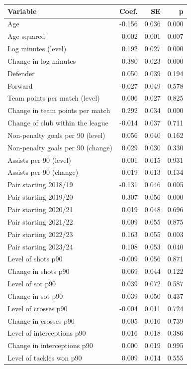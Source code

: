 \begin{tabular}{lrrr}
\toprule
Variable & Coef. & SE & p \\
\midrule
Age & -0.156 & 0.036 & 0.000 \\
Age squared & 0.002 & 0.001 & 0.007 \\
Log minutes (level) & 0.192 & 0.027 & 0.000 \\
Change in log minutes & 0.380 & 0.023 & 0.000 \\
Defender & 0.050 & 0.039 & 0.194 \\
Forward & -0.027 & 0.049 & 0.578 \\
Team points per match (level) & 0.006 & 0.027 & 0.825 \\
Change in team points per match & 0.292 & 0.034 & 0.000 \\
Change of club within the league & -0.014 & 0.037 & 0.711 \\
Non-penalty goals per 90 (level) & 0.056 & 0.040 & 0.162 \\
Non-penalty goals per 90 (change) & 0.029 & 0.030 & 0.330 \\
Assists per 90 (level) & 0.001 & 0.015 & 0.931 \\
Assists per 90 (change) & 0.019 & 0.013 & 0.134 \\
Pair starting 2018/19 & -0.131 & 0.046 & 0.005 \\
Pair starting 2019/20 & 0.307 & 0.056 & 0.000 \\
Pair starting 2020/21 & 0.019 & 0.048 & 0.696 \\
Pair starting 2021/22 & 0.009 & 0.055 & 0.875 \\
Pair starting 2022/23 & 0.163 & 0.055 & 0.003 \\
Pair starting 2023/24 & 0.108 & 0.053 & 0.040 \\
Level of shots p90 & -0.009 & 0.056 & 0.871 \\
Change in shots p90 & 0.069 & 0.044 & 0.122 \\
Level of sot p90 & 0.039 & 0.072 & 0.587 \\
Change in sot p90 & -0.039 & 0.050 & 0.437 \\
Level of crosses p90 & -0.004 & 0.011 & 0.724 \\
Change in crosses p90 & 0.005 & 0.016 & 0.739 \\
Level of interceptions p90 & 0.016 & 0.018 & 0.386 \\
Change in interceptions p90 & 0.000 & 0.019 & 0.995 \\
Level of tackles won p90 & 0.009 & 0.014 & 0.555 \\

\end{tabular}
